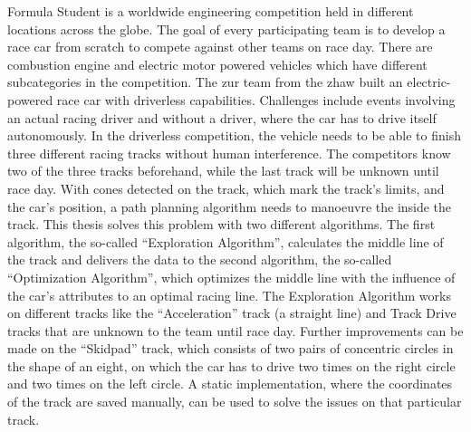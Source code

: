 Formula Student is a worldwide engineering competition held in different locations across the globe. The goal of every participating team is to develop a race car from scratch to compete against other teams on race day. There are combustion engine and electric motor powered vehicles which have different subcategories in the competition. The \acrlong{zur} team from the \acrlong{zhaw} built an electric-powered race car with driverless capabilities. Challenges include events involving an actual racing driver and without a driver, where the car has to drive itself autonomously. In the driverless competition, the vehicle needs to be able to finish three different racing tracks without human interference. The competitors know two of the three tracks beforehand, while the last track will be unknown until race day. With cones detected on the track, which mark the track's limits, and the car's position, a path planning algorithm needs to manoeuvre the inside the track. This thesis solves this problem with two different algorithms. The first algorithm, the so-called ``Exploration Algorithm'', calculates the middle line of the track and delivers the data to the second algorithm, the so-called ``Optimization Algorithm'', which optimizes the middle line with the influence of the car's attributes to an optimal racing line. The Exploration Algorithm works on different tracks like the ``Acceleration'' track (a straight line) and Track Drive tracks that are unknown to the team until race day. Further improvements can be made on the ``Skidpad'' track, which consists of two pairs of concentric circles in the shape of an eight, on which the car has to drive two times on the right circle and two times on the left circle. A static implementation, where the coordinates of the track are saved manually, can be used to solve the issues on that particular track.
